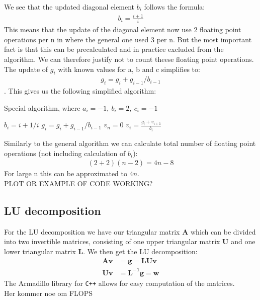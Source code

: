\documentclass[american,a4paper,12pt]{article}
\renewcommand{\vec}[1]{\mathbf{#1}} %
\begin{document}
We see that the updated diagonal element $b_i$ follows the formula:
\begin{align*}
   b_i = \frac{i+1}{i}
\end{align*}
This means that the update of the diagonal element now use 2 floating point operations per n in where the general one used 3 per n. But the most important fact is that this can be precalculated and in practice excluded from the algorithm. We can therefore justify not to count theese floating point operations. The update of $g_i$ with known values for a, b and c simplifies to:
\begin{align*}
  g_i = g_i + g_{i-1}/{b_{i-1}}
\end{align*}
\cite{linalg}. This gives us the following simplified algorithm:
\begin{algorithm}[H]
\caption{Special algorithm, where $a_i = -1,\ b_i = 2,\ c_i = -1$}
\begin{algorithmic}[1]
   
    \State $b_i = {i+1}/i$ 
    \State $g_i = g_i + g_{i-1}/{b_{i-1}}$ 
  \EndFor
  \Statex
  \State $v_n = 0$ 
    \State $v_i = \frac{g_i + v_{i+1}}{b_i}$
  \EndFor
\end{algorithmic}
\end{algorithm}
Similarly to the general algorithm we can calculate total number of floating point operations (not including calculation of $b_i$):
\begin{align*}
  (2 + 2)(n-2) = 4n - 8
\end{align*}
For large n this can be approximated to $4n$.
\\
PLOT OR EXAMPLE OF CODE WORKING?
\subsection{LU decomposition}
For the LU decomposition we have our triangular matrix $\vec{A}$ which can be divided into two invertible matrices, consisting of one upper triangular matrix $\vec{U}$ and one lower triangular matrix $\vec{L}$. We then get the LU decomposition:
\begin{align*}
    \vec{Av} &= \vec{g} = \vec{LUv}\\
    \vec{Uv} &= \vec{L^{-1}g = \vec{w}}
\end{align*}
The Armadillo library for \verb!C++! allows for easy computation of the matrices.\\
Her kommer noe om FLOPS
\end{document}
